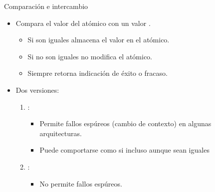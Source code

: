 \begin{frame}[t,fragile]{Comparación e intercambio}
\begin{itemize}
  \item Compara el valor del atómico con un valor .
    \begin{itemize}
      \item Si son iguales almacena el valor  en el atómico.
      \item Si no son iguales no modifica el atómico.
      \item Siempre retorna indicación de éxito o fracaso.
    \end{itemize}

  \item Dos versiones:
    \begin{enumerate}
      \item {}:
        \begin{itemize}
          \item Permite fallos espúreos (cambio de contexto) en algunas arquitecturas.
          \item Puede comportarse como si \cppid{*} incluso aunque sean iguales
        \end{itemize}
      \item {}:
        \begin{itemize}
          \item No permite fallos espúreos.
        \end{itemize}
    \end{enumerate}

\end{itemize}
\end{frame}

